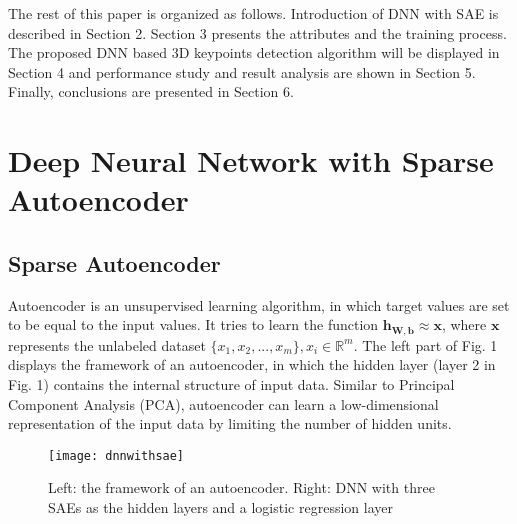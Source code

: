 \documentclass[runningheads]{article}
\begin{document}
The rest of this paper is organized as follows. Introduction of DNN with SAE is described in Section 2. Section 3 presents the attributes and the training process. The proposed DNN based 3D keypoints detection algorithm will be displayed in Section 4 and performance study and result analysis are shown in Section 5. Finally, conclusions are presented in Section 6.

\section{Deep Neural Network with Sparse Autoencoder}
\subsection{Sparse Autoencoder}
Autoencoder \cite{autoencoder2006reducing} is an unsupervised learning algorithm, in which target values are set to be equal to the input values. It tries to learn the function \emph{$\bm{h_{W,b}}\approx \bm{x}$}, where \emph{$\bm{x}$} represents the unlabeled dataset \emph{$\{x_1,x_2,...,x_m\},x_i \in \mathbb{R}^m$}. The left part of Fig. 1 displays the framework of an autoencoder, in which the hidden layer (layer 2 in Fig. 1) contains the internal structure of input data.  Similar to Principal Component Analysis \cite{pca2002principal} (PCA), autoencoder can learn a low-dimensional representation of the input data by limiting the number of hidden units.
\begin{figure}[tbp]
	\centering
	\begin{minipage}[b]{0.95\linewidth}
		\texttt{[image: dnnwithsae]}
		\caption{Left: the framework of an autoencoder. Right: DNN with three SAEs as the hidden layers and a logistic regression layer}
	\end{minipage}
\end{figure}
\end{document}
